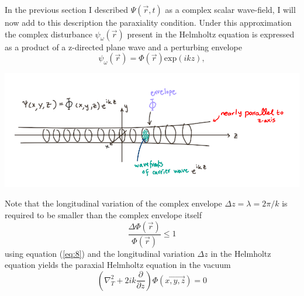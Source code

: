 \documentclass[9pt, a4paper]{article}
\newenvironment{Figure}
    {\par\medskip\noindent\minipage{\linewidth}}
    {\endminipage\par\medskip}
\begin{document}
In the previous section I described $\Psi(\vec{r},t)$ as a complex scalar wave-field, I will now add to this description the paraxiality condition.
Under this approximation the complex disturbance $\psi_{\omega}(\vec{r})$ present in the Helmholtz equation is expressed as a product of a z-directed plane wave and a perturbing envelope\cite{PagsTutes}\cite{CH49}
\begin{equation}\label{eq:7}
\psi_{\omega}(\vec{r}) = \Phi(\vec{r})\mathrm{exp}(ikz),
\end{equation}

 \begin{Figure}
 \centering
 \includegraphics[width=0.6\linewidth]{paraxial_beam.png}
\end{Figure}
Note that the longitudinal variation of the complex envelope $\Delta z = \lambda = 2 \pi/k$ is required to be smaller than the complex envelope itself
\begin{equation}\label{eq:8}
\frac{\Delta \Phi(\vec{r})}{\Phi(\vec{r})} \leq 1
\end{equation}
using equation (\ref{eq:8}) and the longitudinal variation $\Delta z$  in the Helmholtz equation yields the paraxial Helmholtz equation in the vacuum
\begin{equation}\label{eq:9}
\left (\nabla_{T}^{2} + 2 i k \frac{\partial }{\partial z}\right ) \Phi(\vec{x , y, z}) = 0
\end{equation}
\end{document}
